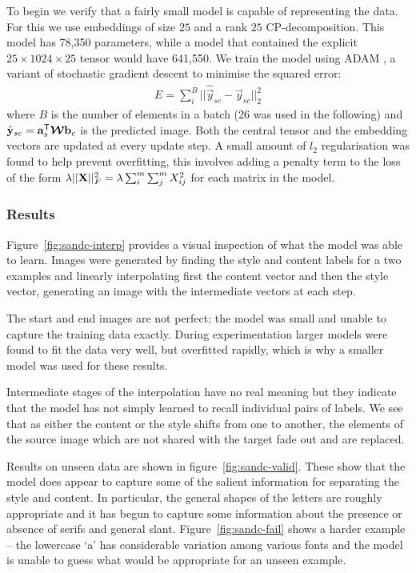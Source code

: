 To begin we verify that a fairly small model is capable of representing the data. For this we
use embeddings of size \(25\) and a rank \(25\) CP-decomposition. This model has 78,350
parameters, while a model that contained the explicit \(25 \times 1024 \times 25\) tensor
would have 641,550. We train the model using ADAM \autocite{Kingma2014}, a variant of
stochastic gradient descent to minimise the squared error:
\begin{align}
	E = \sum_{i}^B ||\hat{\vec{y}}_{sc} - \vec{y}_{sc}||_2^2
\end{align} where \(B\) is the number of elements in a batch (26 was used in the following) and
\(\hat{\mathbf{y}}_{sc} = \mathbf{a}_s^\mathsf{T}\bm{\mathcal{W}}\mathbf{b}_c\) is the predicted image. Both
the central tensor and the embedding vectors are updated at every update step. A small amount
of \(l_2\) regularisation was found to help prevent overfitting, this involves adding a penalty
term to the loss of the form \(\lambda||\mathbf{X}||_F^2 = \lambda\sum_i^m\sum_j^mX_{ij}^2\) for
each matrix in the model.

\subsubsection{Results}
Figure~\ref{fig:sandc-interp} provides a visual inspection of what the model was able to
learn. Images were generated by finding the style and content labels for a two examples and
linearly interpolating first the content vector and then the style vector, generating an
image with the intermediate vectors at each step. 

The start and end images are not perfect; the model was small and unable to capture the training
data exactly. During experimentation larger models were found to fit the data very well, but 
overfitted rapidly, which is why a smaller model was used for these results.

Intermediate stages of the interpolation have no real meaning but they indicate that the model has
not simply learned to recall individual pairs of labels. We see that as either the content or
the style shifts from one to another, the elements of the source image which are not shared with
the target fade out and are replaced.

Results on unseen data are shown in figure~\ref{fig:sandc-valid}. These show that the model does
appear to capture some of the salient information for separating the style and content. In
particular, the general shapes of the letters are roughly appropriate and it has begun to capture
some information about the presence or absence of serifs and general slant.
Figure~\ref{fig:sandc-fail} shows a harder example -- the lowercase `a' has considerable variation
among various fonts and the model is unable to guess what would be appropriate for an unseen
example. 

